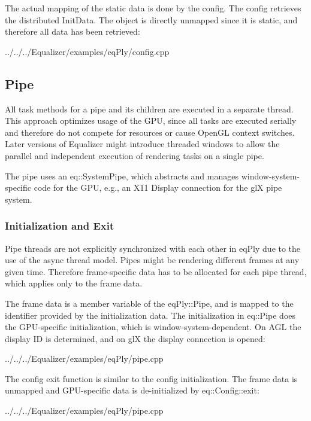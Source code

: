 \documentclass[10pt,a4]{scrartcl}
\begin{document}
The actual mapping of the static data is done by the config. The config
retrieves the distributed \textsf{InitData}. The object is directly unmapped
since it is static, and therefore all data has been retrieved:

{\footnotesize
  {../../../Equalizer/examples/eqPly/config.cpp}}

\subsection{Pipe}

All task methods for a pipe and its children are executed in a separate
thread. This approach optimizes usage of the GPU, since all
tasks are executed serially and therefore do not compete for resources
or cause OpenGL context switches. Later versions of Equalizer might
introduce threaded windows to allow the parallel and independent
execution of rendering tasks on a single pipe.

The pipe uses an \textsf{eq::SystemPipe}, which abstracts and manages
window-system-specific code for the GPU, e.g., an X11 \textsf{Display}
connection for the glX pipe system.

\subsubsection{Initialization and Exit}

Pipe threads are not explicitly synchronized with each other in \textsf{eqPly}
due to the use of the async thread model. Pipes might be rendering different
frames at any given time. Therefore frame-specific data has to be allocated for
each pipe thread, which applies only to the frame data.

The frame data is a member variable of the \textsf{eqPly::Pipe}, and is mapped
to the identifier provided by the initialization data. The initialization in
\textsf{eq::Pipe} does the GPU-specific initialization, which is
window-system-dependent. On AGL the display ID is determined, and on glX the
display connection is opened:

{\footnotesize
  {../../../Equalizer/examples/eqPly/pipe.cpp}}

The config exit function is similar to the config initialization. The
frame data is unmapped and GPU-specific data is de-initialized by
\textsf{eq::Config::exit}:

{\footnotesize
  {../../../Equalizer/examples/eqPly/pipe.cpp}}
\end{document}
